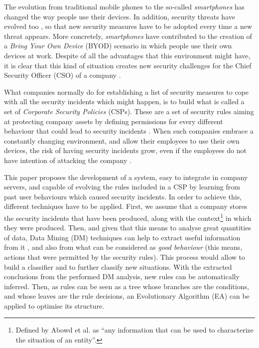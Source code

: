 \documentclass{sig-alternate}
\begin{document}
The evolution from traditional mobile phones to the so-called \textit{smartphones} has changed the way people use their devices. In addition, security threats have evolved too \cite{gangula2013survey}, so that new security measures have to be adopted every time a new threat appears. More concretely, \textit{smartphones} have contributed to the creation of a \textit{Bring Your Own Device} (BYOD) scenario in which people use their own devices at work. Despite of all the advantages that this environment might have, it is clear that this kind of situation creates new security challenges for the Chief Security Officer (CSO) of a company \cite{Opp_Security11}.

What companies normally do for establishing a list of security measures to cope with all the security incidents which might happen, is to build what is called a set of \textit{Corporate Security Policies} (CSPs). These are a set of security rules aiming at protecting company assets by defining permissions for every different behaviour that could lead to security incidents \cite{kaeo2003designing}. When such companies embrace a constantly changing environment, and allow their employees to use their own devices, the risk of having security incidents grow, even if the employees do not have intention of attacking the company \cite{stanton2005analysis, breivik2002abstract}.

This paper proposes the development of a system, easy to integrate in company servers, and capable of evolving the rules included in a CSP by learning from past user behaviours which caused security incidents. In order to achieve this, different techniques have to be applied. First, we assume that a company stores the security incidents that have been produced, along with the context\footnote{Defined by Abowd et al. \cite{abowd1999towards} as ``any information that can be used to characterize the situation of an entity''.} in which they were produced. Then, and given that this means to analyse great quantities of data, Data Mining (DM) techniques can help to extract useful information from it \cite{DeVel2001}, and also from what can be considered as \textit{good behaviour} (this means, actions that were permitted by the security rules). This process would allow to build a classifier and to further classify new situations. With the extracted conclusions from the performed DM analysis, new rules can be automatically inferred. Then, as rules can be seen as a tree whose branches are the conditions, and whose leaves are the rule decisions, an Evolutionary Algorithm (EA) can be applied to optimise its structure.
\end{document}
